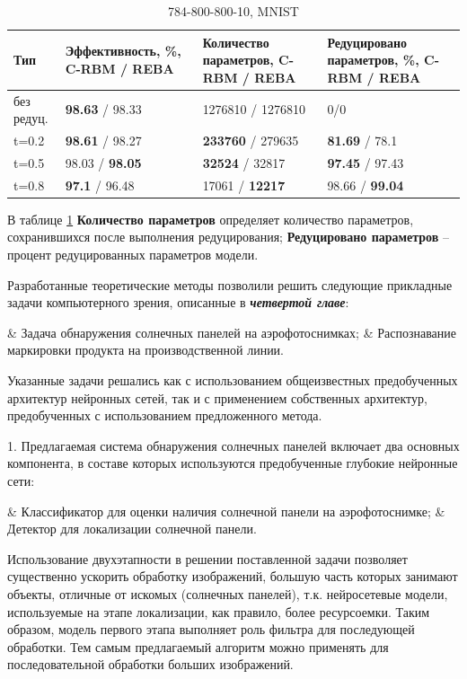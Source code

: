 \documentclass{thesisby}
\begin{document}
\begin{table} [h!]
  \small
  \caption{784-800-800-10, MNIST}\label{table:results_mnist_reduce}
\centering
\begin{tabular}{| p{2cm} | p{4cm} | p{4cm} | p{4cm} |}
  \hline
    \textbf{Тип} & \textbf{Эффективность, \%, C-RBM / REBA} & \textbf{Количество параметров, C-RBM / REBA} & \textbf{Редуцировано параметров, \%, C-RBM / REBA}\\
    \hline
    без редуц. & \textbf{98.63} / 98.33 & 1276810 / 1276810 & 0/0\\
    \hline
    t=0.2 & \textbf{98.61} / 98.27 & \textbf{233760} / 279635 & \textbf{81.69} / 78.1\\
    \hline
    t=0.5 & 98.03 / \textbf{98.05} & \textbf{32524} / 32817 & \textbf{97.45} / 97.43\\
    \hline
    t=0.8 & \textbf{97.1} / 96.48 & 17061 / \textbf{12217} & 98.66 / \textbf{99.04}\\
    \hline
\end{tabular}
\end{table}

В таблице \ref{table:results_mnist_reduce} \textbf{Количество параметров} определяет количество параметров, сохранившихся после выполнения редуцирования; \textbf{Редуцировано параметров} -- процент редуцированных параметров модели.

Разработанные теоретические методы позволили решить следующие прикладные задачи компьютерного зрения, описанные в \textit{\textbf{четвертой главе}}:
\begin{easylistNum}
    & Задача обнаружения солнечных панелей на аэрофотоснимках;
    & Распознавание маркировки продукта на производственной линии.
\end{easylistNum}
Указанные задачи решались как с использованием общеизвестных предобученных архитектур нейронных сетей, так и с применением собственных архитектур, предобученных с использованием предложенного метода.

1. Предлагаемая система обнаружения солнечных панелей включает два основных компонента, в составе которых используются предобученные глубокие нейронные сети: 

\begin{easylistNum}
    & Классификатор для оценки наличия солнечной панели на аэрофотоснимке;
    & Детектор для локализации солнечной панели.
\end{easylistNum}

Использование двухэтапности в решении поставленной задачи позволяет существенно ускорить обработку изображений, большую часть которых занимают объекты, отличные от искомых (солнечных панелей), т.к. нейросетевые модели, используемые на этапе локализации, как правило, более ресурсоемки. Таким образом, модель первого этапа выполняет роль фильтра для последующей обработки. Тем самым предлагаемый алгоритм можно применять для последовательной обработки больших изображений.
\end{document}
